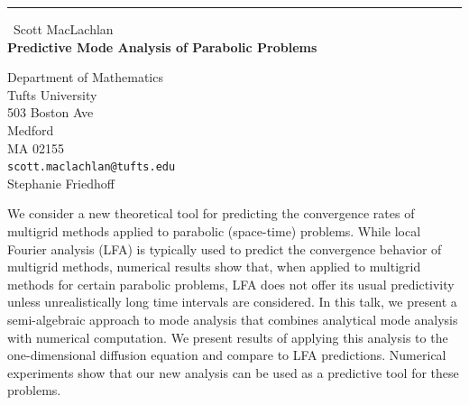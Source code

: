 \documentclass{report}
\begin{document}
\begin{center}
\rule{6in}{1pt} \
{\large Scott MacLachlan \\
{\bf Predictive Mode Analysis of Parabolic Problems}}

Department of Mathematics \\ Tufts University \\ 503 Boston Ave \\ Medford \\ MA 02155
\\
{\tt scott.maclachlan@tufts.edu}\\
Stephanie Friedhoff\end{center}

We consider a new theoretical tool for predicting the convergence
rates of multigrid methods applied to parabolic (space-time) problems.
While local Fourier analysis (LFA) is typically used to predict the
convergence behavior of multigrid methods, numerical results show
that, when applied to multigrid methods for certain parabolic
problems, LFA does not offer its usual predictivity unless
unrealistically long time intervals are considered. In this talk, we
present a semi-algebraic approach to mode analysis that combines
analytical mode analysis with numerical computation. We present
results of applying this analysis to the one-dimensional diffusion
equation and compare to LFA predictions. Numerical experiments show
that our new analysis can be used as a predictive tool for these
problems.
\end{document}
